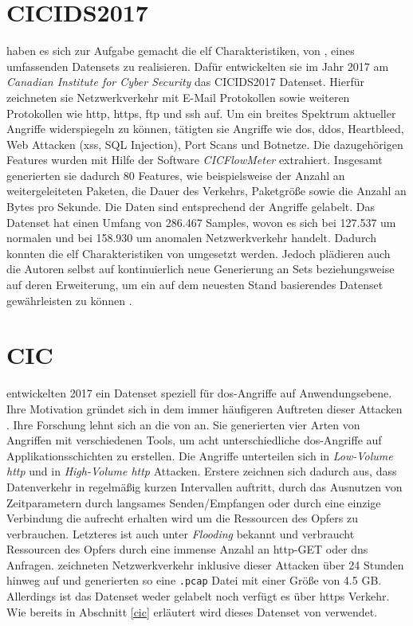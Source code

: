 \documentclass[
    12pt, %
    DIV10,
    ngerman, %
    a4paper, %
    oneside, %
    titlepage, %
    parskip=half, %
    headings=normal, %
    listof=totoc, %
    bibliography=totoc, %
    index=totoc, %
    captions=tableheading, %
    final %
]{scrreprt}
\begin{document}
\section{CICIDS2017}
\textcite{Sharafaldin2018} haben es sich zur Aufgabe gemacht die elf Charakteristiken, von \citeauthor{7885840}, eines umfassenden Datensets  zu realisieren. Dafür entwickelten sie im Jahr 2017 am \emph{Canadian Institute for Cyber Security} das CICIDS2017 Datenset. Hierfür zeichneten sie Netzwerkverkehr mit E-Mail Protokollen sowie weiteren Protokollen wie \ac{http}, \ac{https}, \ac{ftp} und \ac{ssh} auf. Um ein breites Spektrum aktueller Angriffe widerspiegeln zu können, tätigten sie Angriffe wie \ac{dos}, \ac{ddos}, Heartbleed, Web Attacken (\ac{xss}, SQL Injection), Port Scans und Botnetze. Die dazugehörigen Features wurden mit Hilfe der Software \emph{CICFlowMeter} \parencite{Lashkari201} extrahiert. Insgesamt  generierten sie dadurch 80 Features, wie beispielsweise der Anzahl an weitergeleiteten Paketen, die Dauer des Verkehrs, Paketgrö{\ss}e sowie die Anzahl an Bytes pro Sekunde.
Die Daten sind entsprechend der Angriffe gelabelt. Das Datenset hat einen Umfang von 286.467 Samples, wovon es sich bei 127.537 um normalen und bei 158.930 um anomalen Netzwerkverkehr handelt. Dadurch konnten die elf Charakteristiken von \citeauthor{7885840} umgesetzt werden. Jedoch plädieren auch die Autoren selbst auf kontinuierlich neue Generierung an Sets beziehungsweise auf deren Erweiterung, um ein auf dem neuesten Stand basierendes Datenset gewährleisten zu können \parencite{Sharafaldin2018}.
\section{CIC}
\textcite{jazi2017detecting} entwickelten 2017 ein Datenset speziell für \ac{dos}-Angriffe auf Anwendungsebene. Ihre Motivation gründet sich in dem immer häufigeren Auftreten dieser Attacken \parencite{NETSCOUT}.
Ihre Forschung lehnt sich an die von \textcite{shiravi2012toward} an. Sie generierten vier Arten von Angriffen mit verschiedenen Tools, um acht unterschiedliche \ac{dos}-Angriffe auf Applikationsschichten zu erstellen. Die Angriffe unterteilen sich in \emph{Low-Volume \ac{http}} und in \emph{High-Volume \ac{http}} Attacken. Erstere zeichnen sich dadurch aus, dass Datenverkehr in regelmä{\ss}ig kurzen Intervallen auftritt, durch das Ausnutzen von Zeitparametern durch langsames Senden/Empfangen oder durch eine einzige Verbindung die aufrecht erhalten wird um die Ressourcen des Opfers zu verbrauchen. Letzteres ist auch unter \emph{Flooding} bekannt und verbraucht Ressourcen des Opfers durch eine immense Anzahl an \ac{http}-GET oder \ac{dns} Anfragen. \citeauthor{jazi2017detecting} zeichneten Netzwerkverkehr inklusive dieser Attacken über 24 Stunden hinweg auf und generierten so eine \texttt{.pcap} Datei mit einer Grö{\ss}e von 4.5 GB. Allerdings ist das Datenset weder gelabelt noch verfügt es über \ac{https} Verkehr. Wie bereits in Abschnitt \ref{cic} erläutert wird dieses Datenset von \textcite{siracusano2018detection} verwendet.
\end{document}

